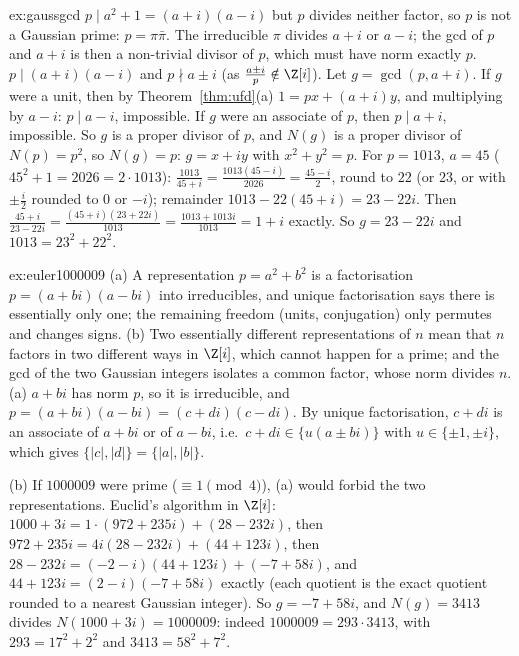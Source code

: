 \begin{solution}{ex:gaussgcd}
\idea $p\mid a^2+1=(a+i)(a-i)$ but $p$ divides neither factor, so $p$ is not a Gaussian prime: $p=\pi\bar\pi$. The irreducible $\pi$ divides $a+i$ or $a-i$; the gcd of $p$ and $a+i$ is then a non-trivial divisor of $p$, which must have norm exactly $p$.
\writeup $p\mid(a+i)(a-i)$ and $p\nmid a\pm i$ (as $\frac{a\pm i}p\notin\Z[i]$). Let $g=\gcd(p,a+i)$. If $g$ were a unit, then by Theorem~\ref{thm:ufd}(a) $1=px+(a+i)y$, and multiplying by $a-i$: $p\mid a-i$, impossible. If $g$ were an associate of $p$, then $p\mid a+i$, impossible. So $g$ is a proper divisor of $p$, and $N(g)$ is a proper divisor of $N(p)=p^2$, so $N(g)=p$: $g=x+iy$ with $x^2+y^2=p$. For $p=1013$, $a=45$ ($45^2+1=2026=2\cdot1013$): $\frac{1013}{45+i}=\frac{1013(45-i)}{2026}=\frac{45-i}2$, round to $22$ (or $23$, or with $\pm\frac i2$ rounded to $0$ or $-i$); remainder $1013-22(45+i)=23-22i$. Then $\frac{45+i}{23-22i}=\frac{(45+i)(23+22i)}{1013}=\frac{1013+1013i}{1013}=1+i$ exactly. So $g=23-22i$ and $1013=23^2+22^2$.
\end{solution}

\begin{solution}{ex:euler1000009}
\idea (a) A representation $p=a^2+b^2$ is a factorisation $p=(a+bi)(a-bi)$ into irreducibles, and unique factorisation says there is essentially only one; the remaining freedom (units, conjugation) only permutes and changes signs. (b) Two essentially different representations of $n$ mean that $n$ factors in two different ways in $\Z[i]$, which cannot happen for a prime; and the gcd of the two Gaussian integers isolates a common factor, whose norm divides $n$.
\writeup (a) $a+bi$ has norm $p$, so it is irreducible, and $p=(a+bi)(a-bi)=(c+di)(c-di)$. By unique factorisation, $c+di$ is an associate of $a+bi$ or of $a-bi$, i.e.\ $c+di\in\{u(a\pm bi)\}$ with $u\in\{\pm1,\pm i\}$, which gives $\{|c|,|d|\}=\{|a|,|b|\}$.

(b) If $1000009$ were prime ($\equiv1\pmod4$), (a) would forbid the two representations. Euclid's algorithm in $\Z[i]$: $1000+3i=1\cdot(972+235i)+(28-232i)$, then $972+235i=4i(28-232i)+(44+123i)$, then $28-232i=(-2-i)(44+123i)+(-7+58i)$, and $44+123i=(2-i)(-7+58i)$ exactly (each quotient is the exact quotient rounded to a nearest Gaussian integer). So $g=-7+58i$, and $N(g)=3413$ divides $N(1000+3i)=1000009$: indeed $1000009=293\cdot3413$, with $293=17^2+2^2$ and $3413=58^2+7^2$.
\end{solution}

